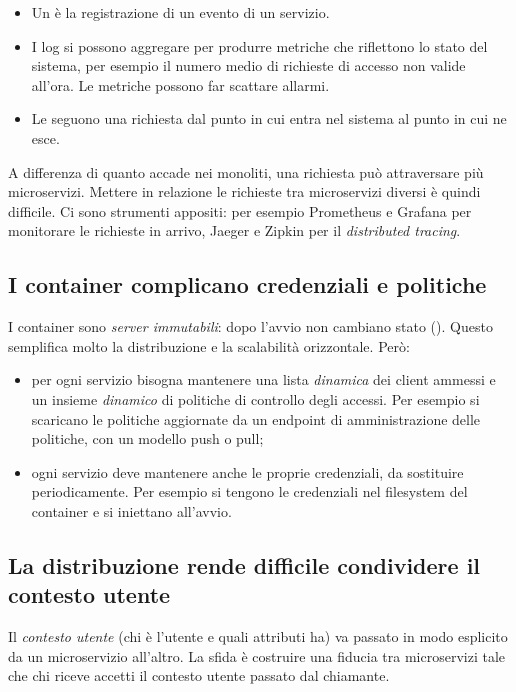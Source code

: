 \begin{itemize}
  \item Un  è la registrazione di un evento di un servizio.
  \item I log si possono aggregare per produrre metriche che riflettono lo stato del sistema, per esempio il numero
    medio di richieste di accesso non valide all'ora. Le metriche possono far scattare allarmi.
  \item Le  seguono una richiesta dal punto in cui entra nel sistema al punto in cui ne esce.
\end{itemize}
A differenza di quanto accade nei monoliti, una richiesta può attraversare più microservizi. Mettere in relazione le
richieste tra microservizi diversi è quindi difficile. Ci sono strumenti appositi: per esempio Prometheus e Grafana
per monitorare le richieste in arrivo, Jaeger e Zipkin per il \emph{distributed tracing}.

\subsection{I container complicano credenziali e politiche}

I container sono \emph{server immutabili}: dopo l'avvio non cambiano stato (). Questo
semplifica molto la distribuzione e la scalabilità orizzontale. Però:
\begin{itemize}
  \item per ogni servizio bisogna mantenere una lista \emph{dinamica} dei client ammessi e un insieme \emph{dinamico}
    di politiche di controllo degli accessi. Per esempio si scaricano le politiche aggiornate da un endpoint di
    amministrazione delle politiche, con un modello push o pull;
  \item ogni servizio deve mantenere anche le proprie credenziali, da sostituire periodicamente. Per esempio si tengono
    le credenziali nel filesystem del container e si iniettano all'avvio.
\end{itemize}

\subsection{La distribuzione rende difficile condividere il contesto utente}

Il \emph{contesto utente} (chi è l'utente e quali attributi ha) va passato in modo esplicito da un microservizio
all'altro. La sfida è costruire una fiducia tra microservizi tale che chi riceve accetti il contesto utente passato dal
chiamante.

